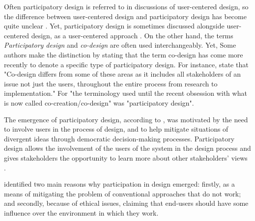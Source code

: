 \documentclass[preprint,12pt]{elsarticle}
\begin{document}
Often participatory design is referred to in discussions of user-centered design, so the difference between user-centered design and participatory design has become quite unclear \cite{bannon2018introduction}. Yet, participatory design is sometimes discussed alongside user-centered design, as a user-centered approach \cite{leng2018designing}.
On the other hand, the terms \textit{Participatory design} and \textit{co-design} are often used  interchangeably. Yet, Some authors make the distinction by stating that the term co-design has come more recently to denote a specific type of participatory design. For instance, \citet{szebeko2010co} state that "Co-design differs from some of these areas as it includes all stakeholders of an issue not just the users, throughout the entire process from research to implementation." For \citet{Sanders2008} "the terminology used until the recent obsession with what is now called co-creation/co-design" was "participatory design".

The emergence of participatory design, according to \citet{bannon2018introduction}, was motivated by the need to involve users in the process of design, and to help mitigate situations of divergent ideas through democratic decision-making processes. Participatory design allows the involvement of the users of the system in the design process and gives stakeholders the opportunity to learn more about other stakeholders' views \cite{unger2013designing}.

\citet{dearnley1983favour} identified two main reasons why participation in design emerged: firstly, as a means of mitigating the problem of conventional approaches that do not work; and secondly, because of ethical issues, claiming that end-users should have some influence over the environment in which they work.
\end{document}

